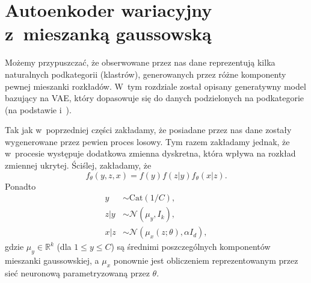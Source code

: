 \documentclass{iithesis}
\begin{document}
%
%

\section{Autoenkoder wariacyjny z~mieszanką gaussowską} \label{sec:vae_gm}
Możemy przypuszczać, że obserwowane przez nas dane reprezentują kilka naturalnych podkategorii (klastrów),
generowanych przez różne komponenty pewnej mieszanki rozkładów. W~tym rozdziale został opisany
generatywny model bazujący na VAE, który dopasowuje się do danych podzielonych na podkategorie
(na podstawie \cite{m2} i~\cite{real_gmvae}).

Tak jak w~poprzedniej części zakładamy, że posiadane przez nas dane zostały wygenerowane przez
pewien proces losowy. Tym razem zakładamy jednak, że w~procesie występuje dodatkowa zmienna dyskretna,
która wpływa na rozkład zmiennej ukrytej. Ściślej, zakładamy, że
\begin{equation}
f_\theta(y, z, x) = f(y) f(z|y) f_\theta(x|z).
\end{equation}
Ponadto
\begin{equation}
\begin{aligned}
y &\sim \text{Cat}(1/C), \\
z|y &\sim \mathcal{N}(\mu_y, I_k), \\
x|z &\sim \mathcal{N}(\mu_x(z;\theta), \alpha I_d),
\end{aligned}
\end{equation}
gdzie $\mu_y \in \mathbb{R}^k$ (dla $1 \leq y \leq C$) są średnimi poszczególnych komponentów mieszanki gaussowskiej,
a $\mu_x$ ponownie jest obliczeniem reprezentowanym przez sieć neuronową parametryzowaną przez $\theta$.
\end{document}
